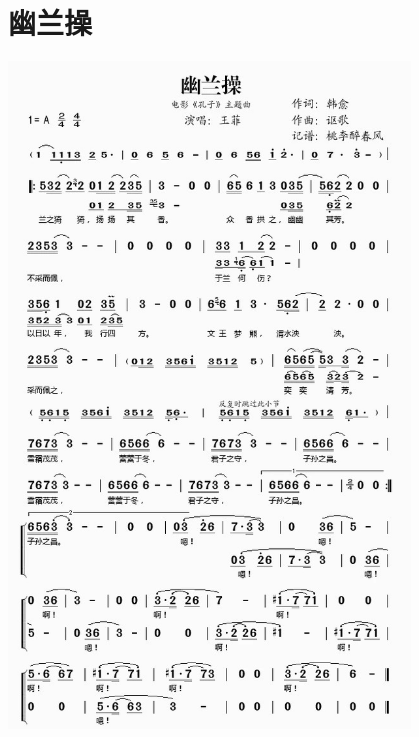 \documentclass[cn,pad,twocol]{elegantbook}
\begin{document}
\section{幽兰操}\includegraphics[width=0.8\textwidth]{dongxiao/20200819/幽兰操.jpeg}
\end{document}
